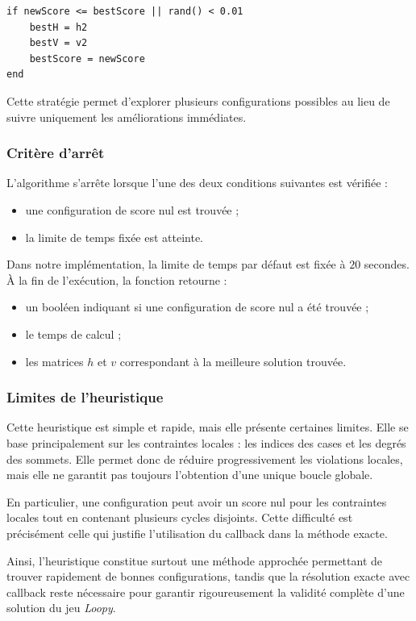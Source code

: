 \begin{verbatim}
if newScore <= bestScore || rand() < 0.01
    bestH = h2
    bestV = v2
    bestScore = newScore
end
\end{verbatim}

Cette stratégie permet d'explorer plusieurs configurations possibles au lieu de suivre uniquement les améliorations immédiates.

\subsubsection{Critère d'arrêt}

L'algorithme s'arrête lorsque l'une des deux conditions suivantes est vérifiée :
\begin{itemize}
    \item une configuration de score nul est trouvée ;
    \item la limite de temps fixée est atteinte.
\end{itemize}

Dans notre implémentation, la limite de temps par défaut est fixée à \(20\) secondes. À la fin de l'exécution, la fonction retourne :
\begin{itemize}
    \item un booléen indiquant si une configuration de score nul a été trouvée ;
    \item le temps de calcul ;
    \item les matrices \(h\) et \(v\) correspondant à la meilleure solution trouvée.
\end{itemize}

\subsubsection{Limites de l'heuristique}

Cette heuristique est simple et rapide, mais elle présente certaines limites. Elle se base principalement sur les contraintes locales : les indices des cases et les degrés des sommets. Elle permet donc de réduire progressivement les violations locales, mais elle ne garantit pas toujours l'obtention d'une unique boucle globale.

En particulier, une configuration peut avoir un score nul pour les contraintes locales tout en contenant plusieurs cycles disjoints. Cette difficulté est précisément celle qui justifie l'utilisation du callback dans la méthode exacte.

Ainsi, l'heuristique constitue surtout une méthode approchée permettant de trouver rapidement de bonnes configurations, tandis que la résolution exacte avec callback reste nécessaire pour garantir rigoureusement la validité complète d'une solution du jeu \textit{Loopy}.

